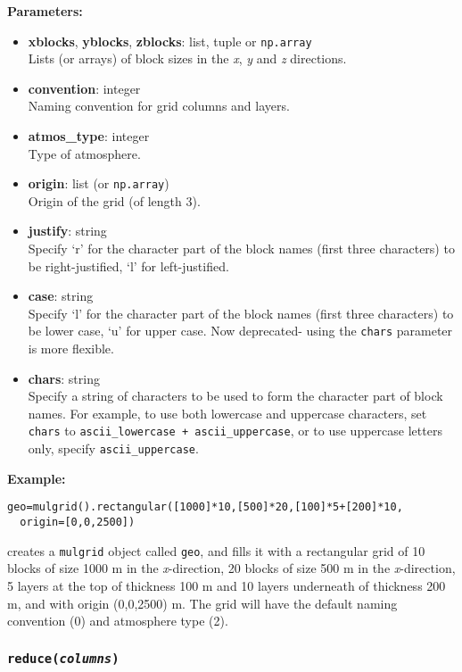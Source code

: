 \textbf{Parameters:}
\begin{itemize}
\item \textbf{xblocks}, \textbf{yblocks}, \textbf{zblocks}: list, tuple or \texttt{np.array}\\
  Lists (or arrays) of block sizes in the \emph{x}, \emph{y} and \emph{z} directions.
\item \textbf{convention}: integer\\
  Naming convention for grid columns and layers.
\item \textbf{atmos\_type}: integer\\
  Type of atmosphere.
\item \textbf{origin}: list (or \texttt{np.array})\\
  Origin of the grid (of length 3).
\item \textbf{justify}: string\\
  Specify `r' for the character part of the block names (first three characters) to be right-justified, `l' for left-justified.
\item \textbf{case}: string\\
  Specify `l' for the character part of the block names (first three characters) to be lower case, `u' for upper case.  Now deprecated- using the \texttt{chars} parameter is more flexible.
\item \textbf{chars}: string\\
  Specify a string of characters to be used to form the character part of block names.  For example, to use both lowercase and uppercase characters, set \texttt{chars} to \texttt{ascii\_lowercase + ascii\_uppercase}, or to use uppercase letters only, specify \texttt{ascii\_uppercase}.
\end{itemize}

\textbf{Example:}

\begin{verbatim}
geo=mulgrid().rectangular([1000]*10,[500]*20,[100]*5+[200]*10,
  origin=[0,0,2500])
\end{verbatim}

creates a \texttt{mulgrid} object called \texttt{geo}, and fills it with a rectangular grid of 10 blocks of size 1000 m in the \emph{x}-direction, 20 blocks of size 500 m in the \emph{x}-direction, 5 layers at the top of thickness 100 m and 10 layers underneath of thickness 200 m, and with origin (0,0,2500) m.  The grid will have the default naming convention (0) and atmosphere type (2).

\subsubsection{\texttt{reduce(\emph{columns})}}
\label{sec:reduce}

